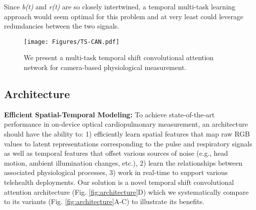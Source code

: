\documentclass{article}
\begin{document}
Since \textit{b(t)} and \textit{r(t)} are so closely intertwined, a temporal multi-task learning approach would seem optimal for this problem and at very least could leverage redundancies between the two signals. 


\begin{figure*}[t!]
  \texttt{[image: Figures/TS-CAN.pdf]}
  \caption{We present a multi-task temporal shift convolutional attention network for camera-based physiological measurement. }
  \label{fig:TS-CAN}
\end{figure*}

\label{sec: optical_model}
\subsection{Architecture}
\textbf{Efficient Spatial-Temporal Modeling:}
To achieve state-of-the-art performance in on-device optical cardiopulmonary measurement, an architecture should have the ability to: 1) efficiently learn spatial features that map raw RGB values to latent representations corresponding to the pulse and respiratory signals as well as temporal features that offset various sources of noise (e.g., head motion, ambient illumination changes, etc.), 2) learn the relationships between associated physiological processes, 3) work in real-time to support various telehealth deployments. Our solution is a novel temporal shift convolutional attention architecture (Fig. \ref{fig:architecture}D) which we systematically compare to its variants (Fig. \ref{fig:architecture}A-C) to illustrate its benefits.
\end{document}

